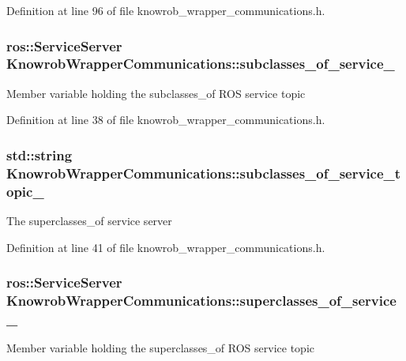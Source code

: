 Definition at line 96 of file knowrob\-\_\-wrapper\-\_\-communications.\-h.

\hypertarget{classKnowrobWrapperCommunications_aa694eb182b48822ca845e34096b17ad4}{
\subsubsection[{subclasses\-\_\-of\-\_\-service\-\_\-}]{\setlength{\rightskip}{0pt plus 5cm}ros\-::\-Service\-Server Knowrob\-Wrapper\-Communications\-::subclasses\-\_\-of\-\_\-service\-\_\-\hspace{0.3cm}{\ttfamily [private]}}}\label{classKnowrobWrapperCommunications_aa694eb182b48822ca845e34096b17ad4}
Member variable holding the subclasses\-\_\-of R\-O\-S service topic 

Definition at line 38 of file knowrob\-\_\-wrapper\-\_\-communications.\-h.

\hypertarget{classKnowrobWrapperCommunications_afbce99db77d63a6a052ebf7041cbc232}{
\subsubsection[{subclasses\-\_\-of\-\_\-service\-\_\-topic\-\_\-}]{\setlength{\rightskip}{0pt plus 5cm}std\-::string Knowrob\-Wrapper\-Communications\-::subclasses\-\_\-of\-\_\-service\-\_\-topic\-\_\-\hspace{0.3cm}{\ttfamily [private]}}}\label{classKnowrobWrapperCommunications_afbce99db77d63a6a052ebf7041cbc232}
The superclasses\-\_\-of service server 

Definition at line 41 of file knowrob\-\_\-wrapper\-\_\-communications.\-h.

\hypertarget{classKnowrobWrapperCommunications_a4f20e98c56e5dd773524db0518ea55a2}{
\subsubsection[{superclasses\-\_\-of\-\_\-service\-\_\-}]{\setlength{\rightskip}{0pt plus 5cm}ros\-::\-Service\-Server Knowrob\-Wrapper\-Communications\-::superclasses\-\_\-of\-\_\-service\-\_\-\hspace{0.3cm}{\ttfamily [private]}}}\label{classKnowrobWrapperCommunications_a4f20e98c56e5dd773524db0518ea55a2}
Member variable holding the superclasses\-\_\-of R\-O\-S service topic 

